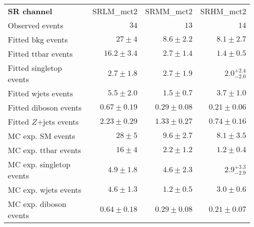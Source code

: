 

\begin{table}
\begin{center}
\setlength{\tabcolsep}{0.0pc}
{\small
\begin{tabular*}{\textwidth}{@{\extracolsep{\fill}}lrrr}
\noalign{\smallskip}\hline\noalign{\smallskip}
{\textbf{ SR channel}}           & SRLM\_mct2            & SRMM\_mct2            & SRHM\_mct2              \\[-0.05cm]
\noalign{\smallskip}\hline\noalign{\smallskip}
Observed events          & $34$              & $13$              & $14$                    \\
\noalign{\smallskip}\hline\noalign{\smallskip}
Fitted bkg events         & $27 \pm 4$          & $8.6 \pm 2.2$          & $8.1 \pm 2.7$              \\
\noalign{\smallskip}\hline\noalign{\smallskip}
        Fitted ttbar events         & $16.2 \pm 3.4$          & $2.7 \pm 1.4$          & $1.4 \pm 0.5$              \\
        Fitted singletop events         & $2.7 \pm 1.8$          & $2.7 \pm 1.9$          & $2.0_{-2.0}^{+2.4}$              \\
        Fitted wjets events         & $5.5 \pm 2.0$          & $1.5 \pm 0.7$          & $3.7 \pm 1.0$              \\
        Fitted diboson events         & $0.67 \pm 0.19$          & $0.29 \pm 0.08$          & $0.21 \pm 0.06$              \\
        Fitted $Z$+jets events         & $2.23 \pm 0.29$          & $1.33 \pm 0.27$          & $0.74 \pm 0.16$              \\
 \noalign{\smallskip}\hline\noalign{\smallskip}
MC exp. SM events              & $28 \pm 5$          & $9.6 \pm 2.7$          & $8.1 \pm 3.5$              \\
\noalign{\smallskip}\hline\noalign{\smallskip}
        MC exp. ttbar events         & $16 \pm 4$          & $2.2 \pm 1.2$          & $1.2 \pm 0.4$              \\
        MC exp. singletop events         & $4.9 \pm 1.8$          & $4.6 \pm 2.3$          & $2.9_{-2.9}^{+3.3}$              \\
        MC exp. wjets events         & $4.6 \pm 1.3$          & $1.2 \pm 0.5$          & $3.0 \pm 0.6$              \\
        MC exp. diboson events         & $0.64 \pm 0.18$          & $0.29 \pm 0.08$          & $0.21 \pm 0.07$              \\

\end{tabular*}}
\end{center}
\end{table}
